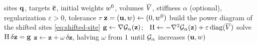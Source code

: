 \documentclass[main.tex]{subfiles}
\begin{document}
\begin{algorithm}[h]
  \caption{Newton solve of $\jointdual_\alpha$ (or of $\jointdual$, for $\alpha = \infty$).}
  \label{alg:newton}
  \begin{algorithmic}[1]
    \Require sites $\mathbf{q}$, targets $\overline{\mathbf{c}}$, initial weights $w^0$, volumes $\overline{V}$, stiffness $\alpha$ (optional), regularization $\varepsilon \!>\! 0$, tolerance $\tau$
    \State $\mathbf{z} = (\mathbf{u}, w) \gets (0, w^0)$
    \Repeat
      \State build the power diagram of the shifted sites \eqref{eq:shifted-site}
      \State $\mathbf{g} \gets \nabla\mathcal{G}_\alpha(\mathbf{z})$; \ $\mathrm{H} \gets -\nabla^2\mathcal{G}_\alpha(\mathbf{z}) + \varepsilon\,\mathrm{diag}(\overline{V})$ 
      \State solve $\mathrm{H}\,\delta\mathbf{z} = \mathbf{g}$
      \State $\mathbf{z} \gets \mathbf{z} + \omega\,\delta\mathbf{z}$, halving $\omega$ from $1$ until $\jointdual_\alpha$ increases
    \State \Return $(\mathbf{u}, w)$
  \end{algorithmic}
\end{algorithm}
\end{document}
